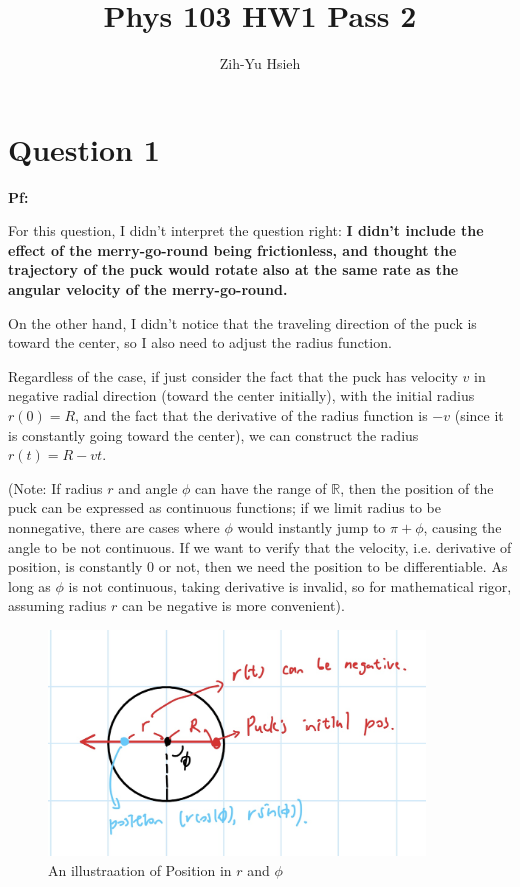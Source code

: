 \documentclass{article}
\title{Phys 103 HW1 Pass 2}
\author{Zih-Yu Hsieh}
\newcommand{\RR}{\mathbb{R}}
\begin{document}
\maketitle

\section*{Question 1}

\textbf{Pf:}

For this question, I didn't interpret the question right: \textbf{I didn't include the effect of the merry-go-round being frictionless, and thought the trajectory of the puck would rotate also at the same rate as the angular velocity of the merry-go-round.} 

On the other hand, I didn't notice that the traveling direction of the puck is toward the center, so I also need to adjust the radius function.

\hfil

Regardless of the case, if just consider the fact that the puck has velocity $v$ in negative radial direction (toward the center initially), with the initial radius $r(0)=R$, and the fact that the derivative of the radius function is $-v$ (since it is constantly going toward the center), we can construct the radius $r(t)=R-vt$.

(Note: If radius $r$ and angle $\phi$ can have the range of $\RR$, then the position of the puck can be expressed as continuous functions; if we limit radius to be nonnegative, there are cases where $\phi$ would instantly jump to $\pi+\phi$, causing the angle to be not continuous. If we want to verify that the velocity, i.e. derivative of position, is constantly $0$ or not, then we need the position to be differentiable. As long as $\phi$ is not continuous, taking derivative is invalid, so for mathematical rigor, assuming radius $r$ can be negative is more convenient).

\begin{figure}[h!]
    \begin{center}
        \includegraphics[width=100mm]{demonstration_q1.jpg}
        \caption{An illustraation of Position in $r$ and $\phi$}
    \end{center}
\end{figure}
\end{document}
